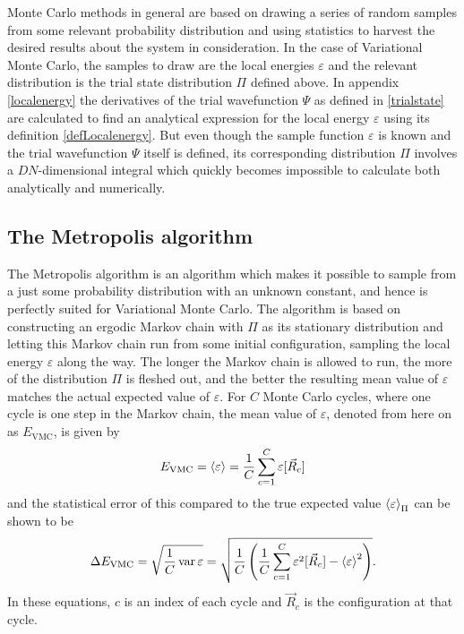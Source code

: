 \documentclass[a4paper,8pt]{article}
\DeclareMathOperator{\variance}{var}
\begin{document}
\begin{multicols}{2}
Monte Carlo methods in general are based on drawing a series of random samples from some relevant probability distribution and using statistics to harvest the desired results about the system in consideration. In the case of Variational Monte Carlo, the samples to draw are the local energies $\varepsilon$ and the relevant distribution is the trial state distribution $\Pi$ defined above. In appendix \ref{localenergy} the derivatives of the trial wavefunction $\Psi$ as defined in \eqref{trialstate} are calculated to find an analytical expression for the local energy $\varepsilon$ using its definition \eqref{defLocalenergy}. But even though the sample function $\varepsilon$ is known and the trial wavefunction $\Psi$ itself is defined, its corresponding distribution $\Pi$ involves a $DN$-dimensional integral which quickly becomes impossible to calculate both analytically and numerically.


\subsection{The Metropolis algorithm}
The Metropolis algorithm is an algorithm which makes it possible to sample from a just some probability distribution with an unknown constant, and hence is perfectly suited for Variational Monte Carlo. The algorithm is based on constructing an ergodic Markov chain with $\Pi$ as its stationary distribution and letting this Markov chain run from some initial configuration, sampling the local energy $\varepsilon$ along the way. The longer the Markov chain is allowed to run, the more of the distribution $\Pi$ is fleshed out, and the better the resulting mean value of $\varepsilon$ matches the actual expected value of $\varepsilon$. For $C$ Monte Carlo cycles, where one cycle is one step in the Markov chain, the mean value of $\varepsilon$, denoted from here on as $E_\text{VMC}$, is given by
\begin{equation}
E_\text{VMC} = \ev{\varepsilon} = \frac{1}{C}\sum\limits_{c = 1}^C \varepsilon[\vec{R}_c]
\end{equation}
and the statistical error of this compared to the true expected value $\ev{\varepsilon}_\Pi$ can be shown to be
\begin{equation} 
\Delta E_\text{VMC} = \sqrt{\frac{1}{C} \variance\varepsilon} = \sqrt{\frac{1}{C}\left(\frac{1}{C}\sum\limits_{c = 1}^C \varepsilon^2[\vec{R}_c] - \ev{\varepsilon}^2\right)}.
\end{equation}
In these equations, $c$ is an index of each cycle and $\vec{R}_c$ is the configuration at that cycle.


\end{multicols}
\end{document}
